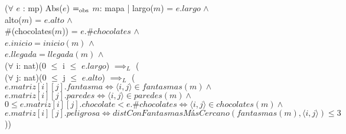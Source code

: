 \documentclass{book}
\begin{document}
        ($\forall$ $e$ : mp) Abs($e$) $=_{\mathrm{obs}}$ $m$: mapa | largo($m$) = $e.largo$ $\wedge$ \\
            \text{}\qquad alto($m$) = $e.alto$ $\wedge$ \\
            \text{}\qquad \#(chocolates($m$)) = $e.\#chocolates$ $\wedge$ \\
            \text{}\qquad $e.inicio = inicio(m)$ $\wedge$ \\
            \text{}\qquad $e.llegada = llegada(m)$ $\wedge$ \\
            \text{}\qquad ($\forall$ i: nat)(0 $\leq$ i $\leq$ $e.largo$) $\implies_L$ ( \\
                \text{}\qquad\quad ($\forall$ j: nat)(0 $\leq$ j $\leq$ $e.alto$) $\implies_L$ ( \\
                \text{}\qquad\quad $e.matriz[i][j].fantasma \iff \langle i,j \rangle \in fantasmas(m) \wedge $ \\
                \text{}\qquad\quad $e.matriz[i][j].paredes \iff \langle i,j \rangle \in paredes(m) \wedge $ \\
                \text{}\qquad\quad $0 \leq e.matriz[i][j].chocolate < e.\#chocolates \iff \langle i,j \rangle \in chocolates(m) \wedge $ \\
                \text{}\qquad\quad $e.matriz[i][j].peligrosa \iff distConFantasmasMásCercano(fantasmas(m), \langle i,j \rangle) \leq 3$))

    \newpage
\end{document}

